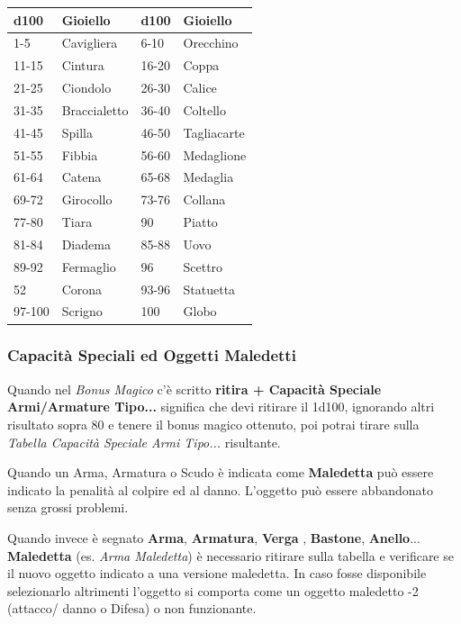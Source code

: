 \begin{multicols}{2}
{{\small \begin{tabularx}{\linewidth}{X|l|X|l}
		\toprule
\rowcolor{gray!20}\textbf{d100} & \textbf{Gioiello} & \textbf{d100} & \textbf{Gioiello}\\
\toprule
1-5 & Cavigliera & 6-10 & Orecchino \\
\rowcolor{gray!20}11-15 & Cintura& 16-20 & Coppa\\
21-25 & Ciondolo& 26-30 & Calice\\
\rowcolor{gray!20}31-35 & Braccialetto& 36-40 & Coltello\\
41-45 & Spilla& 46-50 & Tagliacarte\\
\rowcolor{gray!20}51-55 & Fibbia& 56-60 & Medaglione\\
61-64 & Catena& 65-68 & Medaglia\\
\rowcolor{gray!20}69-72 & Girocollo& 73-76 & Collana\\
77-80 & Tiara& 90& Piatto\\
\rowcolor{gray!20}81-84 & Diadema& 85-88 & Uovo\\
89-92 & Fermaglio& 96 & Scettro\\
\rowcolor{gray!20}52    & Corona& 93-96 & Statuetta\\
97-100 & Scrigno& 100 & Globo
\end{tabularx}}

\subsubsection{Capacità Speciali ed Oggetti Maledetti}

Quando nel \emph{Bonus Magico} c'è scritto \textbf{ritira + Capacità Speciale Armi/Armature Tipo...} significa che devi ritirare il 1d100, ignorando altri risultato sopra 80 e tenere il bonus magico ottenuto, poi potrai tirare sulla \emph{Tabella Capacità Speciale Armi Tipo...} risultante.

Quando un Arma, Armatura o Scudo è indicata come \textbf{Maledetta} può essere indicato la penalità al colpire ed al danno. L'oggetto può essere abbandonato senza grossi problemi.

Quando invece è segnato \textbf{Arma}, \textbf{Armatura}, \textbf{Verga} , \textbf{Bastone}, \textbf{Anello}... \textbf{Maledetta} (es. \emph{Arma Maledetta}) è necessario ritirare sulla tabella e verificare se il nuovo oggetto indicato a una versione maledetta. In caso fosse disponibile selezionarlo altrimenti l'oggetto si comporta come un oggetto maledetto -2 (attacco/ danno o Difesa) o non funzionante.\hypertarget{Arma Maledetta}{}\hypertarget{Maledetta}{}\hypertarget{Armatura Maledetta}{}

}
\end{multicols}
